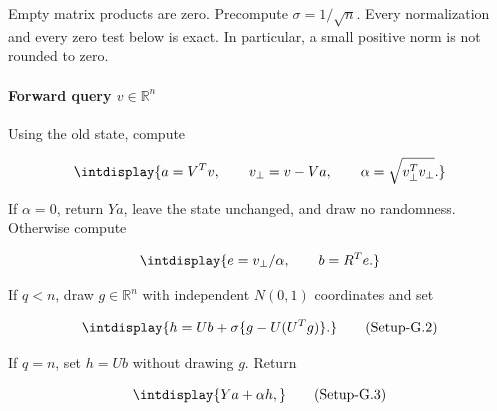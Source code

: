 Empty matrix products are zero. Precompute \(\sigma=1/\sqrt n\). Every normalization and every zero test below is exact. In particular, a small positive norm is not rounded to zero.


\paragraph{Forward query \(v\in\mathbb R^n\)}

\mbox{}\par\smallskip


Using the old state, compute


\begingroup\renewcommand{\theHequation}{intdisplay.1052}
\begin{equation*}
\intdisplay{
a=V^T v,\qquad v_\perp=v-Va,\qquad
 \alpha=\sqrt{v_\perp^T v_\perp}.
}
\end{equation*}
\endgroup


If \(\alpha=0\), return \(Ya\), leave the state unchanged, and draw no randomness. Otherwise compute


\begingroup\renewcommand{\theHequation}{intdisplay.1053}
\begin{equation*}
\intdisplay{
e=v_\perp/\alpha,\qquad b=R^T e.
}
\end{equation*}
\endgroup


If \(q<n\), draw \(g\in\mathbb R^n\) with independent \(N(0,\allowbreak 1)\) coordinates and set


\label{int:eq-setup-g-2}
\begingroup\renewcommand{\theHequation}{intdisplay.1054}
\begin{equation}
\intdisplay{
h=Ub+\sigma\{g-U(U^Tg)\}.
}
\tag{Setup-G.2}
\label{int:eq-0556-setup-g-2}
\end{equation}
\endgroup


If \(q=n\), set \(h=Ub\) without drawing \(g\). Return


\label{int:eq-setup-g-3}
\begingroup\renewcommand{\theHequation}{intdisplay.1055}
\begin{equation}
\intdisplay{
Ya+\alpha h,
}
\tag{Setup-G.3}
\label{int:eq-0557-setup-g-3}
\end{equation}
\endgroup

